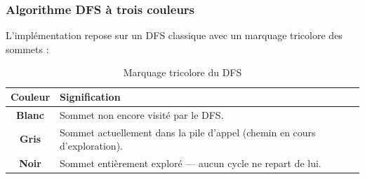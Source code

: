 \documentclass[12pt,a4paper]{article}
\begin{document}
\subsubsection{Algorithme DFS à trois couleurs}

L'implémentation repose sur un DFS classique avec un marquage tricolore
des sommets :

\begin{table}[H]
\centering
\renewcommand{\arraystretch}{1.3}
\begin{tabular}{cl}
\toprule
Couleur & Signification \\
\midrule
\textbf{Blanc} & Sommet non encore visité par le DFS. \\
\textbf{Gris}  & Sommet actuellement dans la pile d'appel (chemin en cours d'exploration). \\
\textbf{Noir}  & Sommet entièrement exploré — aucun cycle ne repart de lui. \\
\bottomrule
\end{tabular}
\caption{Marquage tricolore du DFS}
\end{table}
\end{document}
